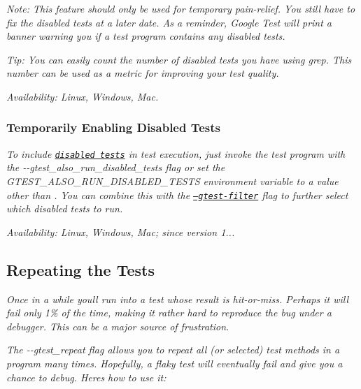 {\itshape {\itshape Note\+:} This feature should only be used for temporary pain-\/relief. You still have to fix the disabled tests at a later date. As a reminder, Google Test will print a banner warning you if a test program contains any disabled tests.}

{\itshape {\itshape Tip\+:} You can easily count the number of disabled tests you have using {\ttfamily grep}. This number can be used as a metric for improving your test quality.}

{\itshape {\itshape Availability\+:} Linux, Windows, Mac.}

{\itshape \subsubsection*{Temporarily Enabling Disabled Tests}}

{\itshape }

{\itshape To include \href{#temporarily-disabling-tests}{\tt disabled tests} in test execution, just invoke the test program with the {\ttfamily -\/-\/gtest\+\_\+also\+\_\+run\+\_\+disabled\+\_\+tests} flag or set the {\ttfamily G\+T\+E\+S\+T\+\_\+\+A\+L\+S\+O\+\_\+\+R\+U\+N\+\_\+\+D\+I\+S\+A\+B\+L\+E\+D\+\_\+\+T\+E\+S\+TS} environment variable to a value other than {}. You can combine this with the \href{#running-a-subset-of-the_tests}{\tt --gtest-\/filter} flag to further select which disabled tests to run.}

{\itshape {\itshape Availability\+:} Linux, Windows, Mac; since version 1...}

{\itshape \subsection*{Repeating the Tests}}

{\itshape }

{\itshape Once in a while you\textquotesingle{}ll run into a test whose result is hit-\/or-\/miss. Perhaps it will fail only 1\% of the time, making it rather hard to reproduce the bug under a debugger. This can be a major source of frustration.}

{\itshape The {\ttfamily -\/-\/gtest\+\_\+repeat} flag allows you to repeat all (or selected) test methods in a program many times. Hopefully, a flaky test will eventually fail and give you a chance to debug. Here\textquotesingle{}s how to use it\+:}


